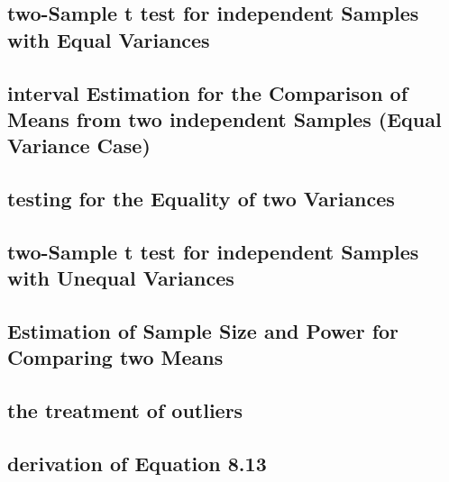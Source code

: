\documentclass[12pt,]{article}
\begin{document}
\hypertarget{two-sample-t-test-for-independent-samples-with-equal-variances}{%
\subsection{two-Sample t test for independent Samples with Equal
Variances}\label{two-sample-t-test-for-independent-samples-with-equal-variances}}

\hypertarget{interval-estimation-for-the-comparison-of-means-from-two-independent-samples-equal-variance-case}{%
\subsection{interval Estimation for the Comparison of Means from two
independent Samples (Equal Variance
Case)}\label{interval-estimation-for-the-comparison-of-means-from-two-independent-samples-equal-variance-case}}

\hypertarget{testing-for-the-equality-of-two-variances}{%
\subsection{testing for the Equality of two
Variances}\label{testing-for-the-equality-of-two-variances}}

\hypertarget{two-sample-t-test-for-independent-samples-with-unequal-variances}{%
\subsection{two-Sample t test for independent Samples with Unequal
Variances}\label{two-sample-t-test-for-independent-samples-with-unequal-variances}}

\hypertarget{estimation-of-sample-size-and-power-for-comparing-two-means}{%
\subsection{Estimation of Sample Size and Power for Comparing two
Means}\label{estimation-of-sample-size-and-power-for-comparing-two-means}}

\hypertarget{the-treatment-of-outliers}{%
\subsection{the treatment of outliers}\label{the-treatment-of-outliers}}

\hypertarget{derivation-of-equation-8.13}{%
\subsection{derivation of Equation
8.13}\label{derivation-of-equation-8.13}}
\end{document}
